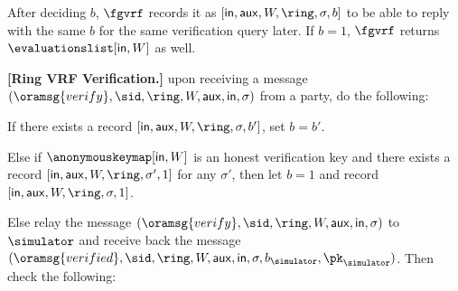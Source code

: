 After deciding $ b $, $ \fgvrf $ records it as $ [\msg, \aux, W,\ring,\sigma,b] $ to be able to reply with the same $ b $ for the same verification query later. If $ b = 1 $, $ \fgvrf $ returns $ \evaluationslist[\msg, W] $ as well.

\begin{tcolorbox}[left=2pt,right=2pt]
	\eprint{}{\small}
	\textbf{[Ring VRF Verification.]} upon receiving a message $(\oramsg{verify}, \sid, \ring,W, \aux, \msg, \sigma)$ from a party, do the following: 
		
		\begin{list}{\hspace*{1pt} C}{\setlength\leftmargin{0.15in}}
			\item If there exists a record $ [\msg,\aux,W,\ring,\sigma, b'] $, set $ b = b' $. 
			
			\label{cond-main:consistency}
			\item Else if $ \anonymouskeymap[\msg,W]  $ is an honest verification key and  there exists a record $ [\msg,\aux, W,\ring, \sigma', 1] $ for any $ \sigma' $, then let $ b=1 $ and record $ [\msg,\aux, W,\ring,\sigma, 1] $. 
			\label{cond-main:differentsignature}
			
			\item \label{cond-main:malicioussignature}Else relay the message $(\oramsg{verify}, \sid, \ring,W,\aux, \msg, \sigma)$ to $ \simulator $ and receive back the message $(\oramsg{verified}, \sid, \ring,W,\aux, \msg, \sigma, b_{\simulator}, \pk_\simulator)$.  Then check the following:
			

\end{list}
\end{tcolorbox}
